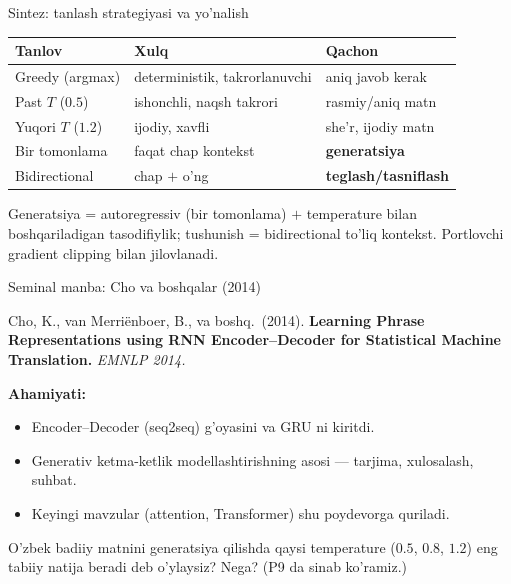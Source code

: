 \documentclass[aspectratio=169,11pt]{beamer}
\begin{document}
\begin{frame}{Sintez: tanlash strategiyasi va yo'nalish}
  \begin{center}\small
  \begin{tabular}{p{3.0cm}p{4.0cm}p{4.2cm}}
    \toprule
    \textbf{Tanlov} & \textbf{Xulq} & \textbf{Qachon} \\
    \midrule
    Greedy (argmax) & deterministik, takrorlanuvchi & aniq javob kerak \\
    Past $T$ ($0.5$) & ishonchli, naqsh takrori & rasmiy/aniq matn \\
    Yuqori $T$ ($1.2$) & ijodiy, xavfli & she'r, ijodiy matn \\
    \midrule
    Bir tomonlama & faqat chap kontekst & \textbf{generatsiya} \\
    Bidirectional & chap $+$ o'ng & \textbf{teglash/tasniflash} \\
    \bottomrule
  \end{tabular}
  \end{center}
  \vspace{4pt}
  \begin{tcolorbox}[okbox,title=Asosiy g'oya,top=2pt,bottom=2pt]
    \footnotesize
    Generatsiya = autoregressiv (bir tomonlama) $+$ temperature bilan boshqariladigan
    tasodifiylik; tushunish = bidirectional to'liq kontekst. Portlovchi gradient
    clipping bilan jilovlanadi.
  \end{tcolorbox}
\end{frame}

\begin{frame}{Seminal manba: Cho va boshqalar (2014)}
  \begin{tcolorbox}[defbox,title=Manba]
    \small
    Cho, K., van Merri\"enboer, B., va boshq.\ (2014). \textbf{Learning Phrase
    Representations using RNN Encoder--Decoder for Statistical Machine Translation.}
    \textit{EMNLP 2014.}
  \end{tcolorbox}
  \vspace{5pt}
  \textbf{Ahamiyati:}
  \begin{itemize}\small\setlength\itemsep{3pt}
    \item Encoder--Decoder (seq2seq) g'oyasini va GRU ni kiritdi.
    \item Generativ ketma-ketlik modellashtirishning asosi --- tarjima, xulosalash, suhbat.
    \item Keyingi mavzular (attention, Transformer) shu poydevorga quriladi.
  \end{itemize}
  \vspace{5pt}
  \begin{tcolorbox}[warnbox,title=Muhokama savoli (P9 gacha o'ylang)]
    \small
    O'zbek badiiy matnini generatsiya qilishda qaysi temperature ($0.5$, $0.8$, $1.2$)
    eng tabiiy natija beradi deb o'ylaysiz? Nega? (P9 da sinab ko'ramiz.)
  \end{tcolorbox}
\end{frame}
\end{document}
